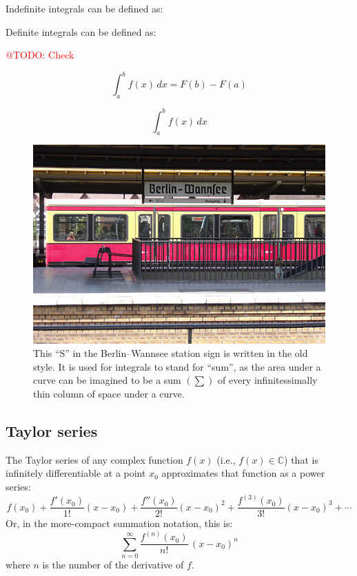\documentclass[a4paper,10pt]{scrartcl}
\makeatletter
\newcommand{\todo}[1]{\textcolor{red}{@TODO: #1}}
\makeatother
\begin{document}
Indefinite integrals can be defined as:

Definite integrals can be defined as:

\todo{Check}

\begin{equation}
\int_a^b \! f(x)\,dx = F(b) - F(a)
\end{equation}

\begin{equation}
\int_a^b \! f(x)\,dx
\end{equation}

\begin{figure}[!ht]
\begin{center}
\includegraphics[width=.5\linewidth]{figures/NumericalAndMath/BerlinWannsee.jpg}
\end{center}
\caption{This ``S'' in the Berlin--Wannsee station sign is written in the old style. It is used for integrals to stand for ``sum'', as the area under a curve can be imagined to be a sum $\left( \sum \right)$ of every infinitessimally thin column of space under a curve.}
\end{figure}

\subsection{Taylor series}

The Taylor series of any complex function $f(x)$ (i.e., $f(x) \in \mathbb{C}$) that is infinitely differentiable at a point $x_0$ approximates that function as a power series:
\begin{equation}
f(x_0)+\frac {f'(x_0)}{1!} (x-x_0)+ \frac{f''(x_0)}{2!} (x-x_0)^2+\frac{f^{(3)}(x_0)}{3!}(x-x_0)^3+ \cdots
\end{equation}
Or, in the more-compact summation notation, this is:
\begin{equation}
\sum_{n=0} ^ {\infty} \frac {f^{(n)}(x_0)}{n!} \, (x-x_0)^{n}
\end{equation}
where $n$ is the number of the derivative of $f$.
\end{document}
